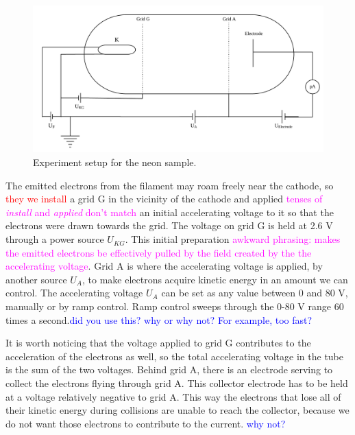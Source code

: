 \documentclass[prb,preprint]{revtex4-1}
\begin{document}
\begin{figure}
    \centering
    \includegraphics[width=\textwidth]{figneon.png}
    \caption{Experiment setup for the neon sample.}
    \label{figneon}
    \end{figure}

The emitted electrons from the filament may roam freely near the cathode, so \textcolor{red}{they we install} a grid G in the vicinity of the cathode and  applied \textcolor{magenta}{tenses of \textit{install} and \textit{applied} don't match} an initial accelerating voltage to it so that the electrons were drawn towards the grid. The voltage on grid G is held at 2.6 V through a power source $U_{KG}$. This initial preparation \textcolor{magenta}{awkward phrasing: makes the emitted electrons be effectively pulled by the field created by the the accelerating voltage}. Grid A is where the accelerating voltage is applied, by another source $U_{A}$, to make electrons acquire kinetic energy in an amount we can control. The accelerating voltage $U_{A}$ can be set as any value between 0 and 80 V, manually or by ramp control. Ramp control sweeps through the 0-80 V range 60 times a second.\textcolor{blue}{did you use this? why or why not? For example, too fast?} 

It is worth noticing that the voltage applied to grid G contributes to the acceleration of the electrons as well, so the total accelerating voltage in the tube is the sum of the two voltages. Behind grid A, there is an electrode serving to collect the electrons flying through grid A. This collector electrode has to be held at a voltage relatively negative to grid A. This way the electrons that lose all of their kinetic energy during collisions are unable to reach the collector, because we do not want those electrons to contribute to the current. \textcolor{blue}{why not?}
\end{document}
